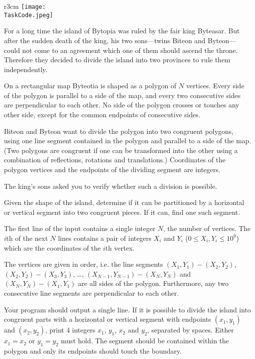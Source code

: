 \documentclass{boi2014}
\renewcommand{\TaskCode}{demarcation}
\begin{document}
    \begin{wrapfigure}{r}{3cm}
        \vspace{-24pt}
		\texttt{[image: \\TaskCode.jpeg]}
	\end{wrapfigure}

    For a long time the island of Bytopia was ruled by the fair king
    Byteasar. But after the sudden death
    of the king, his two sons---twins Biteon and Byteon---could
    not come to an agreement which one of them should ascend the throne.
    Therefore they decided to divide the island into two provinces to
    rule them independently.  
 
    On a rectangular map Byteotia is shaped as a polygon of $N$ vertices.  Every
    side of the polygon is parallel to a side of the map, and every two
    consecutive sides are perpendicular to each other. No side of the polygon
    crosses or touches any other side, except for the common endpoints of
    consecutive sides.
    
    Biteon and Byteon want to divide the polygon into two congruent polygons,
    using one line segment contained in the polygon and parallel to a side of
    the map.  (Two polygons are congruent if one can be transformed into the
    other using a combination of reflections, rotations and translations.)
    Coordinates of the polygon vertices and the endpoints of the dividing
    segment are integers.  
 
    The king's sons asked you to verify whether such a division is
    possible.

    \Task
    Given the shape of the island, determine if it can be partitioned
    by a horizontal or vertical segment into two congruent pieces. If
    it can, find one such segment.
    
    \Input
    The first line of the input contains a single integer $N$, the number of
    vertices. The $i$th of the next $N$ lines contains a pair of integers $X_i$
    and $Y_i$ ($0 \le X_i, Y_i \le 10^9$) which are the coordinates of the $i$th
    vertex.

    The vertices are given in order, i.e. the line segments $(X_1,Y_1) -
    (X_2,Y_2)$, $(X_2,Y_2) - (X_3,Y_3)$, \ldots, $(X_{N-1},Y_{N-1}) - (X_N,Y_N)$
    and $(X_N,Y_N) - (X_1,Y_1)$ are all sides of the polygon.  Furthermore, any
    two consecutive line segments are perpendicular to each other.

	\Output
	Your program should output a single line. If it is possible to divide the
	island into congruent parts with a horizontal or vertical segment with
	endpoints $(x_1, y_1)$ and $(x_2, y_2)$, print 4 integers $x_1$,
	$y_1$, $x_2$ and $y_2$, separated by spaces.
	Either $x_1 = x_2$ or $y_1 = y_2$ must hold.
    The segment should be contained within the polygon and only its endpoints
    should touch the boundary.
\end{document}
